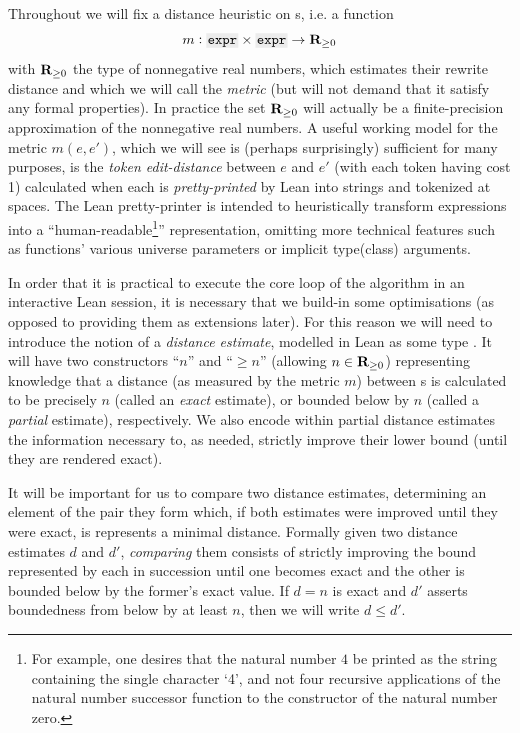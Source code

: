 \documentclass[12pt]{easychair}
\begin{document}
Throughout we will fix a distance heuristic on \expr{}s, i.e. a function
\begin{equation*}
  m : \xx{expr} \times \xx{expr} \to \RR_{\geq 0}
\end{equation*}
with $\mathbf{R}_{\geq 0}$ the type of nonnegative real numbers, which estimates their rewrite distance and which we will call the \textit{metric} (but will not demand that it satisfy any formal properties). In practice the set $\mathbf{R}_{\geq 0}$ will actually be a finite-precision approximation of the nonnegative real numbers. A useful working model for the metric $m(e, e')$, which we will see is (perhaps surprisingly) sufficient for many purposes, is the \textit{token edit-distance} between $e$ and $e'$ (with each token having cost 1) calculated when each is \textit{pretty-printed} by Lean into strings and tokenized at spaces. The Lean pretty-printer is intended to heuristically transform expressions into a ``human-readable\footnote{For example, one desires that the natural number $4$ be printed as the string containing the single character `4', and not four recursive applications of the natural number successor function to the constructor of the natural number zero.}'' representation, omitting more technical features such as functions' various universe parameters or implicit type(class) arguments.

In order that it is practical to execute the core loop of the algorithm in an interactive Lean session, it is necessary that we build-in some optimisations (as opposed to providing them as extensions later). For this reason we will need to introduce the notion of a \textit{distance estimate}, modelled in Lean as some type . It will have two constructors ``$n$'' and ``$\geq n$'' (allowing $n \in \mathbf{R}_{\geq 0}$) representing knowledge that a distance (as measured by the metric $m$) between \expr{}s is calculated to be precisely $n$ (called an \textit{exact} estimate), or bounded below by $n$ (called a \textit{partial} estimate), respectively. We also encode within partial distance estimates the information necessary to, as needed, strictly improve their lower bound (until they are rendered exact).

It will be important for us to compare two distance estimates, determining an element of the pair they form which, if both estimates were improved until they were exact, is represents a minimal distance. Formally given two distance estimates $d$ and $d'$, \textit{comparing} them consists of strictly improving the bound represented by each in succession until one becomes exact and the other is bounded below by the former's exact value. If $d = n$ is exact and $d'$ asserts boundedness from below by at least $n$, then we will write $d \leq d'$.
\end{document}
